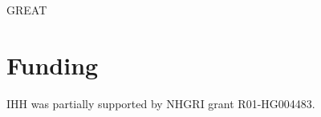 GREAT \cite{pmid20436461}

\section*{Funding}

IHH was partially supported by NHGRI grant R01-HG004483.


%
%
%
%
%
%
%
%



